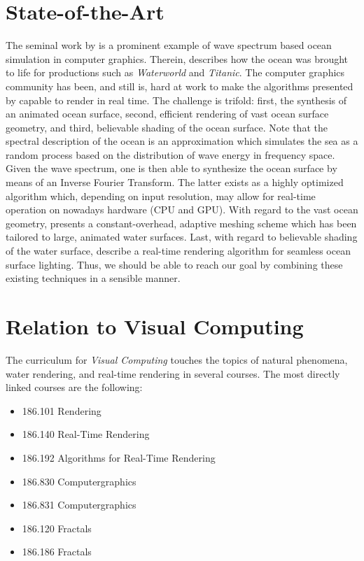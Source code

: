 \documentclass[a4paper,11pt,twoside]{memoir}
\newcommand{\InvFourierTransform}{Inverse Fourier Transform\xspace}
\begin{document}
\section{State-of-the-Art}
The seminal work by \citet{course:simulatingocean}
is a prominent example of wave spectrum based ocean simulation in computer
graphics. Therein, \citeauthor{course:simulatingocean}
describes how the ocean was brought to life for productions such as
\emph{Waterworld} and \emph{Titanic}.
The computer graphics community has been, and still is, hard at work to make
the algorithms presented by \citeauthor{course:simulatingocean} capable to render in real time.
The challenge is trifold: first, the synthesis of an animated ocean surface,
second, efficient rendering of vast ocean surface geometry, and third,
believable shading of the ocean surface.
Note that the spectral description of the ocean is an approximation
which simulates the sea as a random process based on the distribution of wave energy in frequency space. Given the wave spectrum, one is then able to synthesize the ocean surface by means of an \InvFourierTransform. The latter exists
as a highly optimized algorithm \citep{Cooley:1965} which, depending on
input resolution, may allow for real-time operation on nowadays hardware
(CPU and GPU). With regard to the vast ocean geometry, \citet{thesis:johanson} presents a constant-overhead, adaptive meshing scheme which has been tailored to large, animated water surfaces.
Last, with regard to believable shading of the water surface, \citet{article:oceanlighting} describe a real-time rendering algorithm
for seamless ocean surface lighting. Thus, we should be able to reach our
goal by combining these existing techniques in a sensible manner.
\section{Relation to Visual Computing}
The curriculum for \emph{Visual Computing} touches the topics of natural phenomena,
water rendering, and real-time rendering in several courses. The most directly
linked courses are the following:
\begin{itemize}
\item 186.101 Rendering
\item 186.140 Real-Time Rendering
\item 186.192 Algorithms for Real-Time Rendering
\item 186.830 Computergraphics
\item 186.831 Computergraphics 
\item 186.120 Fractals
\item 186.186 Fractals
\end{itemize}




\end{document}

